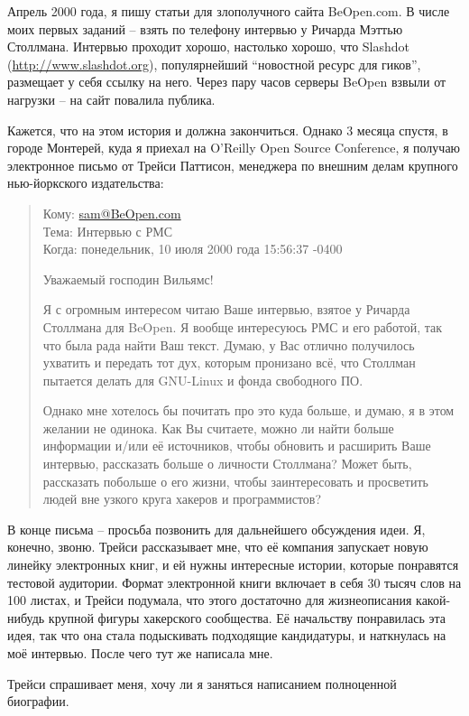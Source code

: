 Апрель 2000 года, я пишу статьи для злополучного сайта BeOpen.com. В числе моих первых заданий -- взять по телефону интервью у Ричарда Мэттью Столлмана. Интервью проходит хорошо, настолько хорошо, что Slashdot (\url{http://www.slashdot.org}), популярнейший ``новостной ресурс для гиков'', размещает у себя ссылку на него. Через пару часов серверы BeOpen взвыли от нагрузки -- на сайт повалила публика.

Кажется, что на этом история и должна закончиться. Однако 3 месяца спустя, в городе Монтерей, куда я приехал на O'Reilly Open Source Conference, я получаю электронное письмо от Трейси Паттисон, менеджера по внешним делам крупного нью-йоркского издательства:

\begin{quote}
Кому: \url{sam@BeOpen.com}\\Тема: Интервью с РМС\\Когда: понедельник, 10 июля 2000 года 15:56:37 -0400

Уважаемый господин Вильямс!

Я с огромным интересом читаю Ваше интервью, взятое у Ричарда Столлмана для BeOpen. Я вообще интересуюсь РМС и его работой, так что была рада найти Ваш текст. Думаю, у Вас отлично получилось ухватить и передать тот дух, которым пронизано всё, что Столлман пытается делать для GNU-Linux и фонда свободного ПО.

Однако мне хотелось бы почитать про это куда больше, и думаю, я в этом желании не одинока. Как Вы считаете, можно ли найти больше информации и/или её источников, чтобы обновить и расширить Ваше интервью, рассказать больше о личности Столлмана? Может быть, рассказать побольше о его жизни, чтобы заинтересовать и просветить людей вне узкого круга хакеров и программистов?
\end{quote}

В конце письма -- просьба позвонить для дальнейшего обсуждения идеи. Я, конечно, звоню. Трейси рассказывает мне, что её компания запускает новую линейку электронных книг, и ей нужны интересные истории, которые понравятся тестовой аудитории. Формат электронной книги включает в себя 30 тысяч слов на 100 листах, и Трейси подумала, что этого достаточно для жизнеописания какой-нибудь крупной фигуры хакерского сообщества. Её начальству понравилась эта идея, так что она стала подыскивать подходящие кандидатуры, и наткнулась на моё интервью. После чего тут же написала мне.

Трейси спрашивает меня, хочу ли я заняться написанием полноценной биографии.

